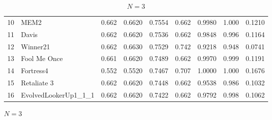 \documentclass[10pt,letterpaper]{article}
\begin{document}
\begin{table}[!hbtp]
\begin{subfigure}[t]{\columnwidth}
\begin{tabular}{llrrrrrrr}
            10 &                  MEM2 &  0.662 &  0.6620 &  0.7554 &   0.662 &  0.9980 &  1.000 &  0.1210 \\
            11 &                 Davis &  0.662 &  0.6620 &  0.7536 &   0.662 &  0.9848 &  0.996 &  0.1164 \\
            12 &              Winner21 &  0.662 &  0.6630 &  0.7529 &   0.742 &  0.9218 &  0.948 &  0.0741 \\
            13 &          Fool Me Once &  0.661 &  0.6620 &  0.7489 &   0.662 &  0.9970 &  0.999 &  0.1191 \\
            14 &             Fortress4 &  0.552 &  0.5520 &  0.7467 &   0.707 &  1.0000 &  1.000 &  0.1676 \\
            15 &           Retaliate 3 &  0.662 &  0.6620 &  0.7448 &   0.662 &  0.9538 &  0.986 &  0.1032 \\
            16 &  EvolvedLookerUp1\_1\_1 &  0.662 &  0.6620 &  0.7422 &   0.662 &  0.9792 &  0.998 &  0.1062 \\
            \bottomrule
            \end{tabular}
        \caption{\(N=3\)}
    \end{subfigure}%


\end{table}
\end{document}
